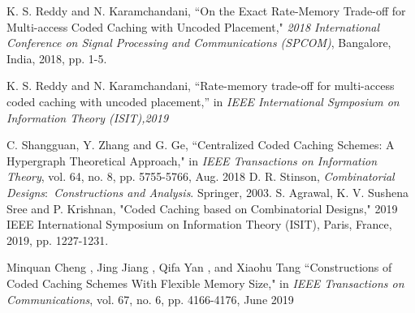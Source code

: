 \documentclass[conference]{IEEEtran}
\begin{document}
\begin{thebibliography}{1}
		K. S. Reddy and N. Karamchandani, ``On the Exact Rate-Memory Trade-off for Multi-access Coded Caching with Uncoded Placement," \textit{2018 International Conference on Signal Processing and Communications (SPCOM)}, Bangalore, India, 2018, pp. 1-5.
		
		K. S. Reddy and N. Karamchandani, ``Rate-memory trade-off for multi-access coded caching with uncoded placement,” in \textit{IEEE International Symposium
			on Information Theory (ISIT),2019}
		
	
		C. Shangguan, Y. Zhang and G. Ge, ``Centralized Coded Caching Schemes: A Hypergraph Theoretical Approach," in \textit{ IEEE Transactions on Information Theory}, vol. 64, no. 8, pp. 5755-5766, Aug. 2018
		D. R. Stinson, \textit{Combinatorial Designs$:$ Constructions and Analysis}. Springer, 2003.
		 S. Agrawal, K. V. Sushena Sree and P. Krishnan, "Coded Caching based on Combinatorial Designs," 2019 IEEE International Symposium on Information Theory (ISIT), Paris, France, 2019, pp. 1227-1231.
	
	    Minquan Cheng , Jing Jiang , Qifa Yan , and Xiaohu Tang
	    ``Constructions of Coded Caching Schemes
	    With Flexible Memory Size," in \textit{IEEE Transactions on Communications}, vol. 67, no. 6, pp. 4166-4176, June 2019
	\end{thebibliography}
	
\end{document}
